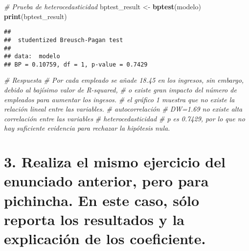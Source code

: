 \documentclass[
]{article}
\newenvironment{Shaded}{\begin{snugshade}}{\end{snugshade}}
\newcommand{\CommentTok}[1]{\textcolor[rgb]{0.56,0.35,0.01}{\textit{#1}}}
\newcommand{\FunctionTok}[1]{\textcolor[rgb]{0.13,0.29,0.53}{\textbf{#1}}}
\newcommand{\NormalTok}[1]{#1}
\newcommand{\OtherTok}[1]{\textcolor[rgb]{0.56,0.35,0.01}{#1}}
\begin{document}
\begin{Shaded}
\begin{Highlighting}[]
\CommentTok{\# Prueba de heterocedasticidad}
\NormalTok{bptest\_result }\OtherTok{\textless{}{-}} \FunctionTok{bptest}\NormalTok{(modelo)}
\FunctionTok{print}\NormalTok{(bptest\_result)}
\end{Highlighting}
\end{Shaded}

\begin{verbatim}
## 
##  studentized Breusch-Pagan test
## 
## data:  modelo
## BP = 0.10759, df = 1, p-value = 0.7429
\end{verbatim}

\begin{Shaded}
\begin{Highlighting}[]
\CommentTok{\# Respuesta}
\CommentTok{\# Por cada empleado se añade 18.45 en los ingresos, sin embargo, debido al bajísimo valor de R{-}squared, }
\CommentTok{\# o existe gran impacto del número de empleados para aumentar los ingesos.}
\CommentTok{\# el gráfico 1 muestra que no existe la relación lineal entre las variables.}
\CommentTok{\# autocorrelación}
\CommentTok{\# DW=1.69 no existe alta correlación entre las variables}
\CommentTok{\# heterocedasticidad}
\CommentTok{\# p es 0.7429, por lo que no hay suficiente evidencia para rechazar la hipótesis nula.}
\end{Highlighting}
\end{Shaded}

\hypertarget{realiza-el-mismo-ejercicio-del-enunciado-anterior-pero-para-pichincha.-en-este-caso-suxf3lo-reporta-los-resultados-y-la-explicaciuxf3n-de-los-coeficiente.}{%
\section{3. Realiza el mismo ejercicio del enunciado anterior, pero para
pichincha. En este caso, sólo reporta los resultados y la explicación de
los
coeficiente.}\label{realiza-el-mismo-ejercicio-del-enunciado-anterior-pero-para-pichincha.-en-este-caso-suxf3lo-reporta-los-resultados-y-la-explicaciuxf3n-de-los-coeficiente.}}
\end{document}
